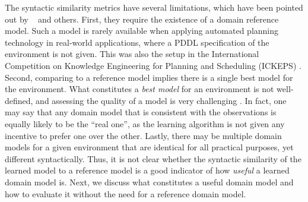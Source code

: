\documentclass[letterpaper]{article} %
\newif\ifaddcomments
\newcommand{\roni}[1]{\ifaddcomments{\textcolor{red}{[Roni: #1]}}\fi}
\newcommand{\gregor}[1]{\ifaddcomments{\textcolor{orange}{[Gregor: #1]}}\fi}
\begin{document}
The syntactic similarity metrics have several limitations, which have been pointed out by ~\cite{garrido2024challenges} and others. 
First, they require the existence of a domain reference model. 
Such a model is rarely available when applying automated planning technology in real-world applications, where a PDDL specification of the environment is not given. 
This was also the setup in the International Competition on Knowledge Engineering for Planning and Scheduling (ICKEPS) \citep{DBLP:journals/aim/ChrpaMVV17}. 
Second, comparing to a reference model implies there is a single best model for the environment. 
What constitutes a \emph{best model} for an environment is not well-defined, and assessing the quality of a model is very challenging \citep{DBLP:conf/kcap/McCluskeyVV17}. 
In fact, one may say that any domain model that is consistent with the observations is equally likely to be the ``real one'', as the learning algorithm is not given any incentive to prefer one over the other. 
Lastly, there may be multiple domain models for a given environment that are identical for all practical purposes, yet different syntactically. 
Thus, it is not clear whether the syntactic similarity of the learned model to a reference model is a good indicator of how \emph{useful} a learned domain model is. 
Next, we discuss what constitutes a useful domain model and how to evaluate it without the need for a reference domain model.


\end{document}
